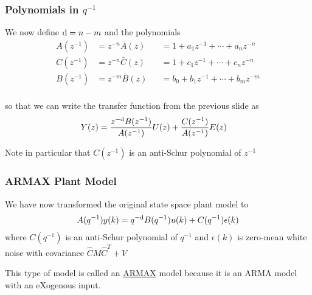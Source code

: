 \begin{frame}
    \frametitle{Polynomials in $q^{-1}$}

    We now define $\textrm{d} = n - m$ and the polynomials
    \begin{align*}
        A(z^{-1}) & = z^{-n} \bar{A}(z) && = 1 + a_1 z^{-1} + \cdots + a_n z^{-n} \\
        C(z^{-1}) & = z^{-n} \bar{C}(z) && = 1 + c_1 z^{-1} + \cdots + c_n z^{-n} \\
        B(z^{-1}) & = z^{-m} \bar{B}(z) && = b_0 + b_1 z^{-1} + \cdots + b_m z^{-m} \\
    \end{align*}
    \paused

    so that we can write the transfer function from the previous slide as
    \begin{align*}
        Y(z) & = \frac{z^{-\textrm{d}} B(z^{-1})}{A(z^{-1})} U(z) + \frac{C(z^{-1})}{A(z^{-1})} E(z)
    \end{align*}
    \paused

    Note in particular that $C(z^{-1})$ is an anti-Schur polynomial of $z^{-1}$

\end{frame}

\begin{frame}
    \frametitle{ARMAX Plant Model}

    We have now transformed the original state space plant model to
    \begin{align*}
        A(q^{-1}) y(k) = q^{-\textrm{d}} B(q^{-1}) u(k) + C(q^{-1}) \epsilon(k)
    \end{align*}
    where $C(q^{-1})$ is an anti-Schur polynomial of $q^{-1}$ and $\epsilon(k)$ is zero-mean white noise with covariance $\hat{C} M \hat{C}^T + V$
    \pause

    \vspace{4ex}

    This type of model is called an \underline{ARMAX} model because it is an ARMA model with an eXogenous input.

\end{frame}



